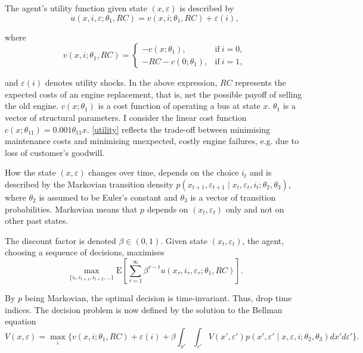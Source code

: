 The agent’s utility function given state $(x, \varepsilon)$ is described by
\begin{equation}
u(x, i, \varepsilon; \theta_1, RC)=v(x, i; \theta_1, RC)+\varepsilon(i), \label{utility}
\end{equation}

where
\begin{equation*}
v(x, i; \theta_1, RC)=
\begin{cases}
-c(x; \theta_1), & \text{if}\ i=0,\\
-RC-c(0;\theta_1), & \text{if}\ i=1,
\end{cases}
\end{equation*}

\noindent and $\varepsilon(i)$ denotes utility shocks. In the above expression, $RC$ represents the expected costs of an engine replacement, that is, net the possible payoff of selling the old engine. $c(x; \theta_1)$ is a cost function of operating a bus at state $x$. $\theta_1$ is a vector of structural parameters. I consider the linear cost function $c(x; \theta_{11}) = 0.001 \theta_{11} x$.
\cref{utility} reflects the trade-off between minimising maintenance costs and minimising unexpected, costly engine failures, e.g. due to loss of customer's goodwill.

How the state $(x, \varepsilon)$ changes over time, depends on the choice $i_t$ and is described by the Markovian transition density $p(x_{t+1}, \varepsilon_{t+1} \mid x_t, \varepsilon_t, i_t; \theta_2, \theta_3)$, where $\theta_2$ is assumed to be Euler’s constant and $\theta_3$ is a vector of transition probabilities. Markovian means that $p$ depends on $ (x_t, \varepsilon_t) $ only and not on other past states.

The discount factor is denoted $\beta \in (0,1) $. Given state $ (x_t, \varepsilon_t) $, the agent, choosing a sequence of decisions, maximises
\begin{equation*}
\max_{\{i_t, i_{t+1}, i_{t+2}, \dots\}}  \mathrm{E} \left[\sum_{\tau=1}^\infty \beta^{\tau-t} u(x_{\tau}, i_{\tau}, \varepsilon_{\tau}; \theta_1, RC) \right].
\end{equation*}

By $p$ being Markovian, the optimal decision is time-invariant. Thus, drop time indices. The decision problem is now defined by the solution to the Bellman equation
\begin{equation*}
	V(x, \varepsilon)=\max_i \{ v(x, i; \theta_1, RC)+\varepsilon(i) + \beta \int_{x'} \int_{\varepsilon'} V(x', \varepsilon')p(x', \varepsilon' \mid x, \varepsilon, i; \theta_2, \theta_3)dx' d \varepsilon' \}.
\end{equation*}

